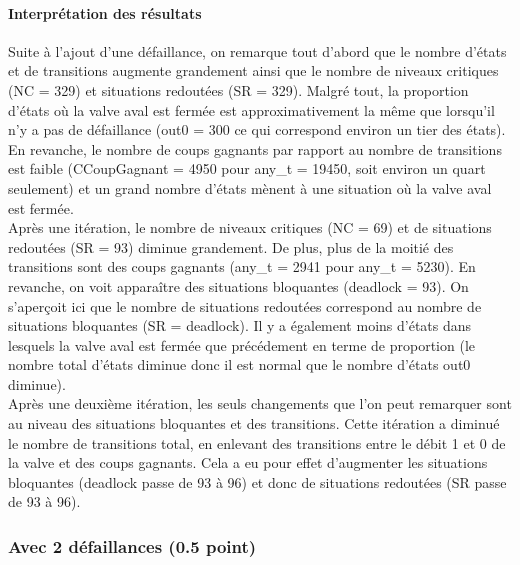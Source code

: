 \documentclass[a4paper]{book}
\begin{document}
\paragraph{Interprétation des résultats}
Suite à l'ajout d'une défaillance, on remarque tout d'abord que le nombre d'états et de transitions augmente grandement ainsi que le nombre 
de niveaux critiques (NC = 329) et situations redoutées (SR = 329). Malgré tout, la proportion d'états où la valve aval est fermée est approximativement 
la même que lorsqu'il n'y a pas de défaillance (out0 = 300 ce qui correspond environ un tier des états). En revanche, le nombre de coups gagnants par rapport 
au nombre de transitions est faible (CCoupGagnant = 4950 pour any\_t = 19450, soit environ un quart seulement) et un grand nombre d'états mènent à une situation où 
la valve aval est fermée. \\
Après une itération, le nombre de niveaux critiques (NC = 69) et de situations redoutées (SR = 93) diminue grandement. De plus, plus de la moitié des transitions 
sont des coups gagnants (any\_t = 2941 pour any\_t = 5230). En revanche, on voit apparaître des situations bloquantes (deadlock = 93). On s'aperçoit ici que le nombre 
de situations redoutées correspond au nombre de situations bloquantes (SR = deadlock). Il y a également moins 
d'états dans lesquels la valve aval est fermée que précédement en terme de proportion (le nombre total d'états diminue donc il est normal que le nombre d'états out0 
diminue).\\
Après une deuxième itération, les seuls changements que l'on peut remarquer sont au niveau des situations bloquantes et des transitions. Cette itération a diminué 
le nombre de transitions total, en enlevant des transitions entre le débit 1 et 0 de la valve et des coups gagnants. Cela a eu pour  
effet d'augmenter les situations bloquantes (deadlock passe de 93 à 96) et donc de situations redoutées (SR passe de 93 à 96).



\subsubsection{Avec 2 défaillances (0.5 point)}





\end{document}
